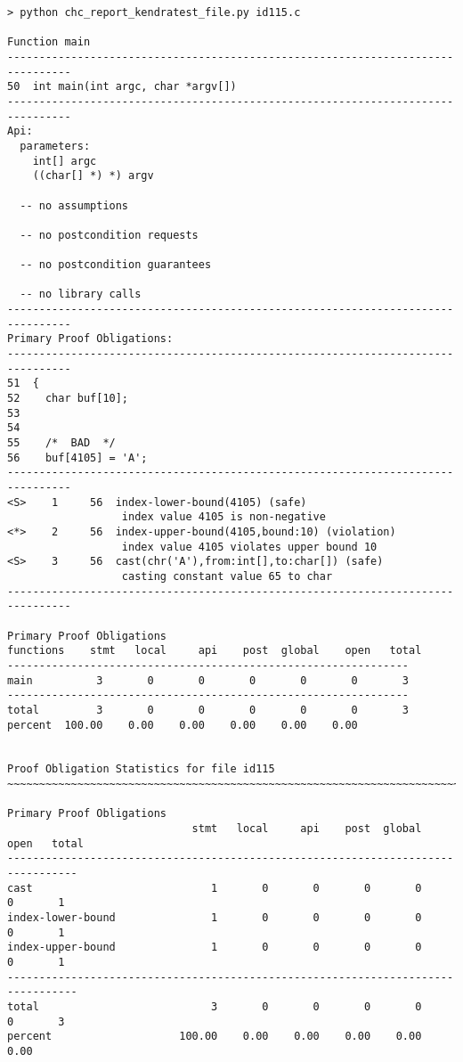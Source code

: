 \documentclass[11pt]{article}
\begin{document}
\begin{small}
\begin{verbatim}
> python chc_report_kendratest_file.py id115.c

Function main
--------------------------------------------------------------------------------
50  int main(int argc, char *argv[])
--------------------------------------------------------------------------------
Api:
  parameters:
    int[] argc
    ((char[] *) *) argv

  -- no assumptions

  -- no postcondition requests

  -- no postcondition guarantees

  -- no library calls
--------------------------------------------------------------------------------
Primary Proof Obligations:
--------------------------------------------------------------------------------
51  {
52    char buf[10];
53
54
55    /*  BAD  */
56    buf[4105] = 'A';
--------------------------------------------------------------------------------
<S>    1     56  index-lower-bound(4105) (safe)
                  index value 4105 is non-negative
<*>    2     56  index-upper-bound(4105,bound:10) (violation)
                  index value 4105 violates upper bound 10
<S>    3     56  cast(chr('A'),from:int[],to:char[]) (safe)
                  casting constant value 65 to char
--------------------------------------------------------------------------------

Primary Proof Obligations
functions    stmt   local     api    post  global    open   total
---------------------------------------------------------------
main          3       0       0       0       0       0       3
---------------------------------------------------------------
total         3       0       0       0       0       0       3
percent  100.00    0.00    0.00    0.00    0.00    0.00


Proof Obligation Statistics for file id115
~~~~~~~~~~~~~~~~~~~~~~~~~~~~~~~~~~~~~~~~~~~~~~~~~~~~~~~~~~~~~~~~~~~~~~~~~~~~~~~~

Primary Proof Obligations
                             stmt   local     api    post  global    open   total
---------------------------------------------------------------------------------
cast                            1       0       0       0       0       0       1
index-lower-bound               1       0       0       0       0       0       1
index-upper-bound               1       0       0       0       0       0       1
---------------------------------------------------------------------------------
total                           3       0       0       0       0       0       3
percent                    100.00    0.00    0.00    0.00    0.00    0.00
\end{verbatim}
\end{small}
\end{document}
